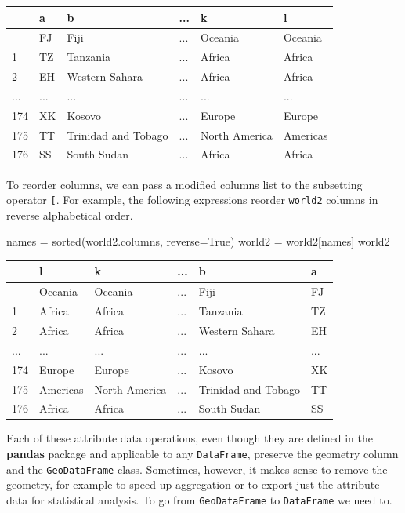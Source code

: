 \documentclass[
  letterpaper,
]{krantz}
\newenvironment{Shaded}{\begin{snugshade}}{\end{snugshade}}
\newcommand{\BuiltInTok}[1]{\textcolor[rgb]{0.00,0.23,0.31}{#1}}
\newcommand{\NormalTok}[1]{\textcolor[rgb]{0.00,0.23,0.31}{#1}}
\newcommand{\OperatorTok}[1]{\textcolor[rgb]{0.37,0.37,0.37}{#1}}
\newcommand{\VariableTok}[1]{\textcolor[rgb]{0.07,0.07,0.07}{#1}}
\begin{document}
\begin{longtable}[]{@{}llllll@{}}
\toprule\noalign{}
& a & b & ... & k & l \\
\midrule\noalign{}
\endhead
\bottomrule\noalign{}
\endlastfoot
0 & FJ & Fiji & ... & Oceania & Oceania \\
1 & TZ & Tanzania & ... & Africa & Africa \\
2 & EH & Western Sahara & ... & Africa & Africa \\
... & ... & ... & ... & ... & ... \\
174 & XK & Kosovo & ... & Europe & Europe \\
175 & TT & Trinidad and Tobago & ... & North America & Americas \\
176 & SS & South Sudan & ... & Africa & Africa \\
\end{longtable}

To reorder columns, we can pass a modified columns list to the
subsetting operator \texttt{{[}}. For example, the following expressions
reorder \texttt{world2} columns in reverse alphabetical order.

\begin{Shaded}
\begin{Highlighting}[]
\NormalTok{names }\OperatorTok{=} \BuiltInTok{sorted}\NormalTok{(world2.columns, reverse}\OperatorTok{=}\VariableTok{True}\NormalTok{)}
\NormalTok{world2 }\OperatorTok{=}\NormalTok{ world2[names]}
\NormalTok{world2}
\end{Highlighting}
\end{Shaded}

\begin{longtable}[]{@{}llllll@{}}
\toprule\noalign{}
& l & k & ... & b & a \\
\midrule\noalign{}
\endhead
\bottomrule\noalign{}
\endlastfoot
0 & Oceania & Oceania & ... & Fiji & FJ \\
1 & Africa & Africa & ... & Tanzania & TZ \\
2 & Africa & Africa & ... & Western Sahara & EH \\
... & ... & ... & ... & ... & ... \\
174 & Europe & Europe & ... & Kosovo & XK \\
175 & Americas & North America & ... & Trinidad and Tobago & TT \\
176 & Africa & Africa & ... & South Sudan & SS \\
\end{longtable}

Each of these attribute data operations, even though they are defined in
the \textbf{pandas} package and applicable to any \texttt{DataFrame},
preserve the geometry column and the \texttt{GeoDataFrame} class.
Sometimes, however, it makes sense to remove the geometry, for example
to speed-up aggregation or to export just the attribute data for
statistical analysis. To go from \texttt{GeoDataFrame} to
\texttt{DataFrame} we need to.
\end{document}

